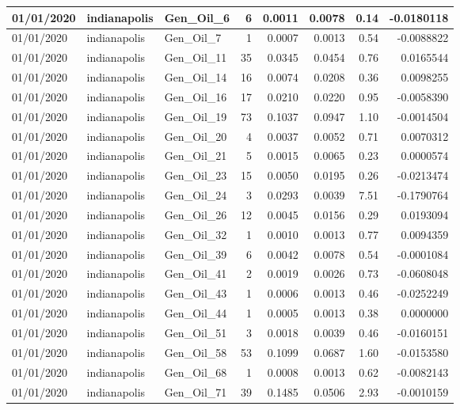 \documentclass[
  letterpaper,
  DIV=11,
  numbers=noendperiod]{scrartcl}
\begin{document}
\begin{tabular}{l|l|l|r|r|r|r|r}
\hline
01/01/2020 & indianapolis & Gen\_Oil\_6 & 6 & 0.0011 & 0.0078 & 0.14 & -0.0180118\\
\hline
01/01/2020 & indianapolis & Gen\_Oil\_7 & 1 & 0.0007 & 0.0013 & 0.54 & -0.0088822\\
\hline
01/01/2020 & indianapolis & Gen\_Oil\_11 & 35 & 0.0345 & 0.0454 & 0.76 & 0.0165544\\
\hline
01/01/2020 & indianapolis & Gen\_Oil\_14 & 16 & 0.0074 & 0.0208 & 0.36 & 0.0098255\\
\hline
01/01/2020 & indianapolis & Gen\_Oil\_16 & 17 & 0.0210 & 0.0220 & 0.95 & -0.0058390\\
\hline
01/01/2020 & indianapolis & Gen\_Oil\_19 & 73 & 0.1037 & 0.0947 & 1.10 & -0.0014504\\
\hline
01/01/2020 & indianapolis & Gen\_Oil\_20 & 4 & 0.0037 & 0.0052 & 0.71 & 0.0070312\\
\hline
01/01/2020 & indianapolis & Gen\_Oil\_21 & 5 & 0.0015 & 0.0065 & 0.23 & 0.0000574\\
\hline
01/01/2020 & indianapolis & Gen\_Oil\_23 & 15 & 0.0050 & 0.0195 & 0.26 & -0.0213474\\
\hline
01/01/2020 & indianapolis & Gen\_Oil\_24 & 3 & 0.0293 & 0.0039 & 7.51 & -0.1790764\\
\hline
01/01/2020 & indianapolis & Gen\_Oil\_26 & 12 & 0.0045 & 0.0156 & 0.29 & 0.0193094\\
\hline
01/01/2020 & indianapolis & Gen\_Oil\_32 & 1 & 0.0010 & 0.0013 & 0.77 & 0.0094359\\
\hline
01/01/2020 & indianapolis & Gen\_Oil\_39 & 6 & 0.0042 & 0.0078 & 0.54 & -0.0001084\\
\hline
01/01/2020 & indianapolis & Gen\_Oil\_41 & 2 & 0.0019 & 0.0026 & 0.73 & -0.0608048\\
\hline
01/01/2020 & indianapolis & Gen\_Oil\_43 & 1 & 0.0006 & 0.0013 & 0.46 & -0.0252249\\
\hline
01/01/2020 & indianapolis & Gen\_Oil\_44 & 1 & 0.0005 & 0.0013 & 0.38 & 0.0000000\\
\hline
01/01/2020 & indianapolis & Gen\_Oil\_51 & 3 & 0.0018 & 0.0039 & 0.46 & -0.0160151\\
\hline
01/01/2020 & indianapolis & Gen\_Oil\_58 & 53 & 0.1099 & 0.0687 & 1.60 & -0.0153580\\
\hline
01/01/2020 & indianapolis & Gen\_Oil\_68 & 1 & 0.0008 & 0.0013 & 0.62 & -0.0082143\\
\hline
01/01/2020 & indianapolis & Gen\_Oil\_71 & 39 & 0.1485 & 0.0506 & 2.93 & -0.0010159\\

\end{tabular}
\end{document}
